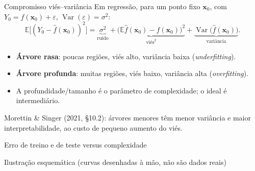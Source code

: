 \documentclass[aspectratio=169]{beamer}
\newcommand{\E}{\mathbb{E}}
\newcommand{\Var}{\operatorname{Var}}
\begin{document}
\begin{frame}{Compromisso viés--variância}
Em regressão, para um ponto fixo $\mathbf x_0$, com $Y_0=f(\mathbf x_0)+\varepsilon$, $\Var(\varepsilon)=\sigma^2$:
\[
\E\bigl[(Y_0-\hat f(\mathbf x_0))^2\bigr]=\underbrace{\sigma^2}_{\text{ruído}}+\underbrace{\bigl(\E\hat f(\mathbf x_0)-f(\mathbf x_0)\bigr)^2}_{\text{viés}^2}+\underbrace{\Var\bigl(\hat f(\mathbf x_0)\bigr)}_{\text{variância}}.
\]
\begin{itemize}
  \item \textbf{Árvore rasa}: poucas regiões, viés alto, variância baixa (\emph{underfitting}).
  \item \textbf{Árvore profunda}: muitas regiões, viés baixo, variância alta (\emph{overfitting}).
  \item A profundidade/tamanho é o \alert{parâmetro de complexidade}; o ideal é intermediário.
\end{itemize}
{\footnotesize Morettin \& Singer (2021, \S10.2): árvores menores têm menor variância e maior interpretabilidade, ao custo de pequeno aumento do viés.}
\end{frame}

\begin{frame}{Erro de treino e de teste versus complexidade}
\centering
{}

{\footnotesize Ilustração \alert{esquemática} (curvas desenhadas à mão, não são dados reais)}
\end{frame}
\end{document}

